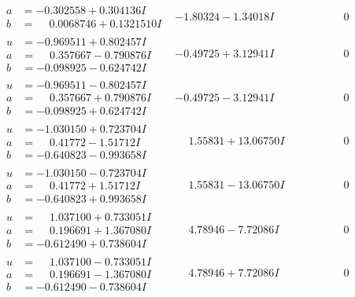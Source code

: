 \documentclass[1p]{elsarticle_modified}
\theoremstyle{definition}
\begin{document}
$$\begin{array}{c|c|c}
\begin{aligned}
a &= -0.302558 + 0.304136 I \\
b &= \phantom{-}0.0068746 + 0.1321510 I\end{aligned}
 & -1.80324 - 1.34018 I & \phantom{-0.000000 } 0 \\ \hline\begin{aligned}
u &= -0.969511 + 0.802457 I \\
a &= \phantom{-}0.357667 - 0.790876 I \\
b &= -0.098925 - 0.624742 I\end{aligned}
 & -0.49725 + 3.12941 I & \phantom{-0.000000 } 0 \\ \hline\begin{aligned}
u &= -0.969511 - 0.802457 I \\
a &= \phantom{-}0.357667 + 0.790876 I \\
b &= -0.098925 + 0.624742 I\end{aligned}
 & -0.49725 - 3.12941 I & \phantom{-0.000000 } 0 \\ \hline\begin{aligned}
u &= -1.030150 + 0.723704 I \\
a &= \phantom{-}0.41772 - 1.51712 I \\
b &= -0.640823 - 0.993658 I\end{aligned}
 & \phantom{-}1.55831 + 13.06750 I & \phantom{-0.000000 } 0 \\ \hline\begin{aligned}
u &= -1.030150 - 0.723704 I \\
a &= \phantom{-}0.41772 + 1.51712 I \\
b &= -0.640823 + 0.993658 I\end{aligned}
 & \phantom{-}1.55831 - 13.06750 I & \phantom{-0.000000 } 0 \\ \hline\begin{aligned}
u &= \phantom{-}1.037100 + 0.733051 I \\
a &= \phantom{-}0.196691 + 1.367080 I \\
b &= -0.612490 + 0.738604 I\end{aligned}
 & \phantom{-}4.78946 - 7.72086 I & \phantom{-0.000000 } 0 \\ \hline\begin{aligned}
u &= \phantom{-}1.037100 - 0.733051 I \\
a &= \phantom{-}0.196691 - 1.367080 I \\
b &= -0.612490 - 0.738604 I\end{aligned}
 & \phantom{-}4.78946 + 7.72086 I & \phantom{-0.000000 } 0 \\ \hline\begin{aligned}

\end{aligned}
\end{array}$$
\end{document}
